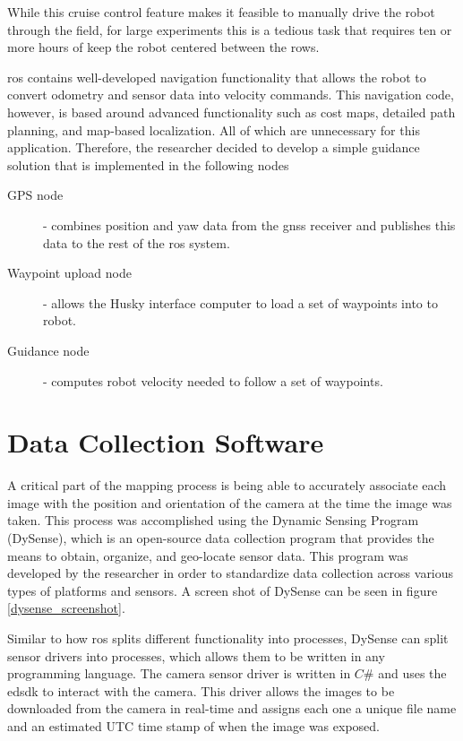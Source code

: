 While this cruise control feature makes it feasible to manually drive the robot through the field, for large experiments this is a tedious task that requires ten or more hours of keep the robot centered between the rows.

\ac{ros} contains well-developed navigation functionality that allows the robot to convert odometry and sensor data into velocity commands.  This navigation code, however, is based around advanced functionality such as cost maps, detailed path planning, and map-based localization. All of which are unnecessary for this application.  Therefore, the researcher decided to develop a simple guidance solution that is implemented in the following nodes

\begin{description}
\item[GPS node] - combines position and yaw data from the \ac{gnss} receiver and publishes this data to the rest of the \ac{ros} system.
\item[Waypoint upload node] - allows the Husky interface computer to load a set of waypoints into to robot.
\item[Guidance node] - computes robot velocity needed to follow a set of waypoints. 
\end{description}

\section{Data Collection Software}
\label{system-software}

A critical part of the mapping process is being able to accurately associate each image with the position and orientation of the camera at the time the image was taken.  This process was accomplished using the Dynamic Sensing Program (DySense), which is an open-source data collection program that provides the means to obtain, organize, and geo-locate sensor data.  This program was developed by the researcher in order to standardize data collection across various types of platforms and sensors.  A screen shot of DySense can be seen in figure \ref{dysense_screenshot}.

Similar to how \ac{ros} splits different functionality into processes, DySense can split sensor drivers into processes, which allows them to be written in any programming language.  The camera sensor driver is written in $C\#$ and uses the \ac{edsdk} to interact with the camera.  This driver allows the images to be downloaded from the camera in real-time and assigns each one a unique file name and an estimated UTC time stamp of when the image was exposed.

